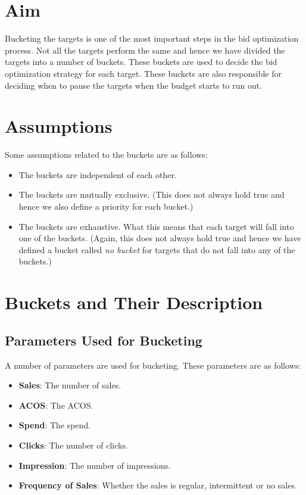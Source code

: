\section{Aim}

Bucketing the targets is one of the most important steps in the bid optimization process. Not all the targets perform the same and hence we have divided the targets into a number of buckets. These buckets are used to decide the bid optimization strategy for each target. These buckets are also responsible for deciding when to pause the targets when the budget starts to run out.

\section{Assumptions}

Some assumptions related to the buckets are as follows:

\begin{itemize}
    \item The buckets are independent of each other.
    \item The buckets are mutually exclusive. (This does not always hold true and hence we also define a priority for each bucket.)
    \item The buckets are exhaustive. What this means that each target will fall into one of the buckets. (Again, this does not always hold true and hence we have defined a bucket called \textit{no bucket} for targets that do not fall into any of the buckets.)
\end{itemize}

\section{Buckets and Their Description}

\subsection{Parameters Used for Bucketing}

A number of parameters are used for bucketing. These parameters are as follows:

\begin{itemize}
    \item \textbf{Sales}: The number of sales.
    \item \textbf{ACOS}: The ACOS.
    \item \textbf{Spend}: The spend.
    \item \textbf{Clicks}: The number of clicks.
    \item \textbf{Impression}: The number of impressions.
    \item \textbf{Frequency of Sales}: Whether the sales is regular, intermittent or no sales.
\end{itemize}

